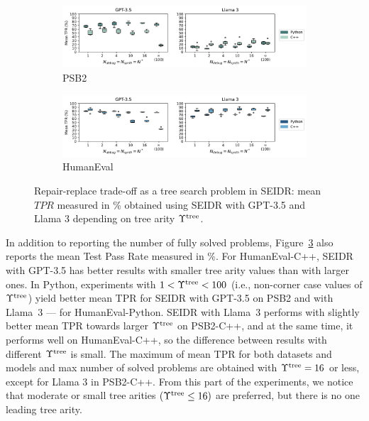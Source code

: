 \begin{figure}
\begin{subfigure}{\linewidth}
\centering
\includegraphics[width=\linewidth, trim={0mm 0mm 0mm 0mm}]{images/mean_tpr_psb2_6runs_boxplot_v5.pdf}
  \caption{PSB2}
  \label{fig:mean-tpr-psb2-gpt3.5}
\end{subfigure}
\begin{subfigure}{\columnwidth}
\centering
\includegraphics[width=\linewidth, trim={0mm 0mm 0mm 0mm}]{images/mean_tpr_humaneval_6runs_boxplot_v5.pdf}
  \caption{HumanEval}
  \label{fig:mean-tpr-he-gpt3.5}
\end{subfigure}
\caption{Repair-replace trade-off as a tree search problem in SEIDR: mean $TPR$ measured in \% obtained using SEIDR with GPT-3.5 and Llama 3 depending on tree arity $\Upsilon^\text{tree}$.}
\label{fig:mean-tpr-repair-replace-trade-off-generalizability}
\end{figure}


In addition to reporting the number of fully solved problems, Figure~\ref{fig:mean-tpr-repair-replace-trade-off-generalizability} also reports the mean Test Pass Rate measured in \%. 
For HumanEval-C++, SEIDR with GPT-3.5 has better results with smaller tree arity values than with larger ones.
In Python, experiments with $1 < \Upsilon^\text{tree} < 100$ (i.e., non-corner case values of $\Upsilon^\text{tree}$) yield better mean TPR for SEIDR with GPT-3.5 on PSB2 and with Llama~3 --- for HumanEval-Python.
SEIDR with Llama~3 performs with slightly better mean TPR towards larger $\Upsilon^\text{tree}$  on PSB2-C++, and at the same time, it performs well on HumanEval-C++, so the difference between results with different $\Upsilon^\text{tree}$ is small.
The maximum of mean TPR for both datasets and models and max number of solved problems are obtained with $\Upsilon^\text{tree}=16$ or less, except for Llama 3 in PSB2-C++. 
From this part of the experiments, we notice that moderate or small tree arities $(\Upsilon^\text{tree} \le 16)$ are preferred, but there is no one leading tree arity.


